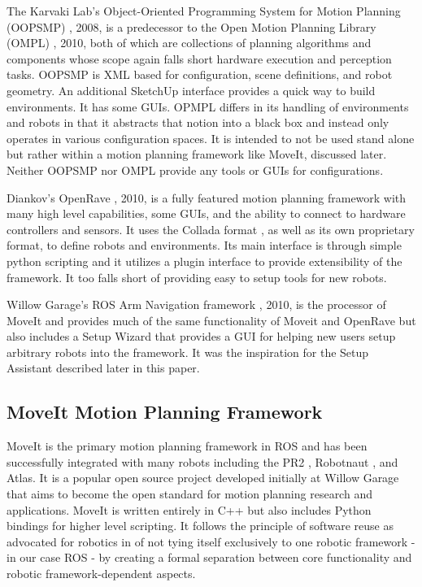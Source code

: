 \documentclass[10pt,journal,compsoc]{joser1}
\begin{document}
{The Karvaki Lab's Object-Oriented Programming System for Motion Planning (OOPSMP) \cite{}, 2008, is a predecessor to the Open Motion Planning Library (OMPL) \cite{}, 2010, both of which are collections of planning algorithms and components whose scope again falls short hardware execution and perception tasks. OOPSMP is XML based for configuration, scene definitions, and robot geometry. An additional SketchUp interface provides a quick way to build environments. It has some GUIs. OPMPL differs in its handling of environments and robots in that it abstracts that notion into a black box and instead only operates in various configuration spaces. It is intended to not be used stand alone but rather within a motion planning framework like MoveIt, discussed later. Neither OOPSMP nor OMPL provide any tools or GUIs for configurations.

Diankov's OpenRave  \cite{}, 2010, is a fully featured motion planning framework with many high level capabilities, some GUIs, and the ability to connect to hardware controllers and sensors. It uses the Collada format \cite{collada}, as well as its own proprietary format, to define robots and environments. Its main interface is through simple python scripting and it utilizes a plugin interface to provide extensibility of the framework. It too falls short of providing easy to setup tools for new robots. 

Willow Garage's ROS Arm Navigation framework \cite{}, 2010, is the processor of MoveIt and provides much of the same functionality of Moveit and OpenRave but also includes a Setup Wizard that provides a GUI for helping new users setup arbitrary robots into the framework. It was the inspiration for the Setup Assistant described later in this paper.

\subsection{MoveIt Motion Planning Framework}
\label{sec::moveit}

MoveIt is the primary motion planning framework in ROS and has been successfully integrated with many robots including the PR2 \cite{wyrobek2008towards}, Robotnaut \cite{ambrose2000robonaut}, and Atlas. It is a popular open source project developed initially at Willow Garage that aims to become the open standard for motion planning research and applications. MoveIt is written entirely in C++ but also includes Python bindings for higher level scripting. It follows the principle of software reuse as advocated for robotics in \cite{makarenko2007benefits} of not tying itself exclusively to one robotic framework - in our case ROS - by creating a formal separation between core functionality and robotic framework-dependent aspects. 

}
\end{document}
